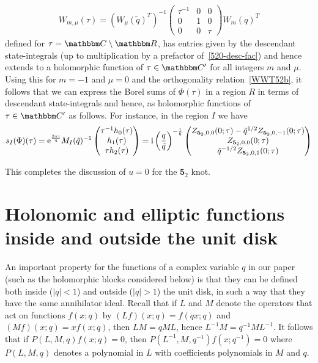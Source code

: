\documentclass[12pt,reqno]{amsart}
\theoremstyle{definition}
\def\BR{\mathbbm R}
\def\BC{\mathbbm C}
\def\tq{\tilde{q}}
\def\ri{\mathrm{i}}
\def\re{{\rm e}}
\def\ri{{\rm i}}
\def\diag{\mathrm{diag}}
\def\md{\mathbf}
\newcommand{\knot}[1]{\md{#1}}
\begin{document}
\begin{align}
  \label{W520-desc}
  W_{m,\mu}(\tau) = (W_\mu(\tq)^T)^{-1}
  \begin{pmatrix} \tau^{-1} & 0 & 0 \\ 0 & 1 & 0 \\ 0 & 0 & \tau
    \end{pmatrix}  W_m(q)^T 
\end{align}
defined for $\tau=\BC\setminus\BR$, has entries given by the
descendant state-integrals (up to multiplication by a prefactor
of~\eqref{520-desc-fac}) and hence extends to a holomorphic function
of $\tau \in \BC'$ for all integers $m$ and $\mu$. Using this for
$m=-1$ and $\mu=0$ and the orthogonality relation~\eqref{WWT52b}, it
follows that we can express the Borel sums of $\Phi(\tau)$ in a region
$R$ in terms of descendant state-integrals and hence, as holomorphic
functions of $\tau \in \BC'$ as follows. For instance, in the region
$I$ we have
\begin{equation}
  s_I(\Phi)(\tau) = \re^{\frac{3\pi\ri}{4}}M_I(\tq)^{-1}
  \begin{pmatrix}
    \tau^{-1}h_0(\tau) \\
    h_1(\tau) \\
    \tau h_2(\tau)
  \end{pmatrix}
  = \ri\left(\frac{q}{\tq}\right)^{-\frac{1}{8}}
  \begin{pmatrix}
    Z_{\knot{5}_2,0,0}(0;\tau)-\tq^{1/2}Z_{\knot{5}_2,0,-1}(0;\tau) \\
    Z_{\knot{5}_2,0,0}(0;\tau)\\
    \tq^{-1/2}Z_{\knot{5}_2,0,1}(0;\tau)
\end{pmatrix}
\end{equation}
  
This completes the discussion of $u=0$ for the $\knot{5}_2$ knot.


\section{Holonomic and elliptic functions inside and outside
  the unit disk}
\label{sec.elliptic}

An important property for the functions of a complex variable $q$ in
our paper (such as the holomorphic blocks considered below) is that
they can be defined both inside ($|q|<1$) and outside ($|q|>1$) the unit
disk, in such a way that they have the same annihilator ideal. Recall
that if $L$ and $M$ denote the operators that act on functions
$f(x;q)$ by $(L f)(x;q)=f(qx;q)$ and $(M f)(x;q)=x f(x;q)$, then
$LM=q ML$, hence $L^{-1}M=q^{-1}ML^{-1}$. It follows that if
$P(L,M,q)f(x;q)=0$, then $P(L^{-1},M,q^{-1}) f(x;q^{-1})=0$ where
$P(L,M,q)$ denotes a polynomial in $L$ with coefficients polynomials
in $M$ and $q$.
\end{document}

